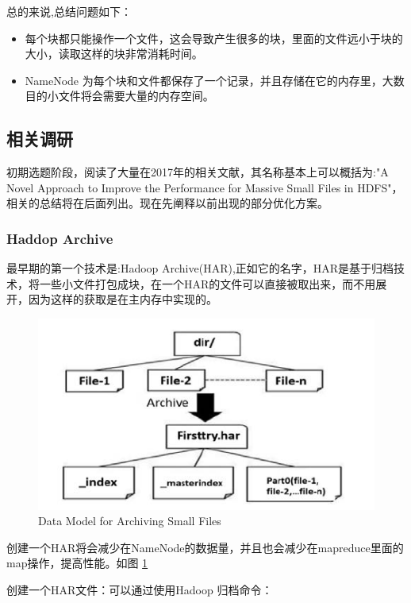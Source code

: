\documentclass[UTF8]{ctexart}
\begin{document}
总的来说,\cite{Sachin}总结问题如下：

\begin{itemize}
\item 每个块都只能操作一个文件，这会导致产生很多的块，里面的文件远小于块的大小，读取这样的块非常消耗时间。
\item NameNode 为每个块和文件都保存了一个记录，并且存储在它的内存里，大数目的小文件将会需要大量的内存空间。
\end{itemize}

\subsection{相关调研}
初期选题阶段，阅读了大量在2017年的相关文献，其名称基本上可以概括为:"A Novel Approach to Improve the Performance for Massive Small Files in HDFS"，相关的总结将在后面列出。现在先阐释以前出现的部分优化方案。

\subsubsection{Haddop Archive}
最早期的第一个技术\cite{Korat}是:Hadoop Archive(HAR),正如它的名字，HAR是基于归档技术，将一些小文件打包成块，在一个HAR的文件可以直接被取出来，而不用展开，因为这样的获取是在主内存中实现的。

\begin{figure}[h]
\centering
\includegraphics{DataModelforArchivingSmallFiles.PNG}
\caption{Data Model for Archiving Small Files}
\label{fig:DataModelforArchivingSmallFiles}
\end{figure}

创建一个HAR将会减少在NameNode的数据量，并且也会减少在mapreduce里面的map操作，提高性能。如图 \ref{fig:DataModelforArchivingSmallFiles}

创建一个HAR文件：可以通过使用Hadoop 归档命令：
\end{document}
